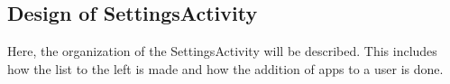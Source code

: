 \subsection{Design of SettingsActivity}

Here, the organization of the SettingsActivity will be described.
This includes how the list to the left is made and how the addition of apps to a user is done.